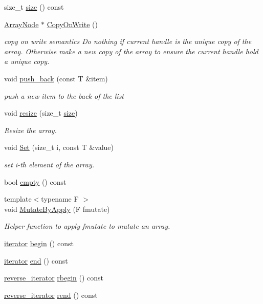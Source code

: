 \begin{DoxyCompactItemize}
size\+\_\+t \hyperlink{classtvm_1_1Array_a6c150ee7d3e46117b099d2052b19aec5}{size} () const 
\item 
\hyperlink{classtvm_1_1ArrayNode}{Array\+Node} $\ast$ \hyperlink{classtvm_1_1Array_a8ebe3653e2bcef7481ab6264f7c231c8}{Copy\+On\+Write} ()
\begin{DoxyCompactList}\small\item\em copy on write semantics Do nothing if current handle is the unique copy of the array. Otherwise make a new copy of the array to ensure the current handle hold a unique copy. \end{DoxyCompactList}\item 
void \hyperlink{classtvm_1_1Array_a24d5ac1f6730d46cb1a6d16729f0a7bb}{push\+\_\+back} (const T \&item)
\begin{DoxyCompactList}\small\item\em push a new item to the back of the list \end{DoxyCompactList}\item 
void \hyperlink{classtvm_1_1Array_a8303345e666f9c72586721bc067e7fc9}{resize} (size\+\_\+t \hyperlink{classtvm_1_1Array_a6c150ee7d3e46117b099d2052b19aec5}{size})
\begin{DoxyCompactList}\small\item\em Resize the array. \end{DoxyCompactList}\item 
void \hyperlink{classtvm_1_1Array_ab3db968deb4be7a51767f22d267eb7af}{Set} (size\+\_\+t i, const T \&value)
\begin{DoxyCompactList}\small\item\em set i-\/th element of the array. \end{DoxyCompactList}\item 
bool \hyperlink{classtvm_1_1Array_a531169863918d8464aa4b905d236674f}{empty} () const 
\item 
{\footnotesize template$<$typename F $>$ }\\void \hyperlink{classtvm_1_1Array_abb864921139827a886c8fec5b7796041}{Mutate\+By\+Apply} (F fmutate)
\begin{DoxyCompactList}\small\item\em Helper function to apply fmutate to mutate an array. \end{DoxyCompactList}\item 
\hyperlink{classtvm_1_1Array_a82550eb5257293ba5af8866aa8ff16e6}{iterator} \hyperlink{classtvm_1_1Array_a5db0d3faad39ca865162e50d555a25fa}{begin} () const 
\item 
\hyperlink{classtvm_1_1Array_a82550eb5257293ba5af8866aa8ff16e6}{iterator} \hyperlink{classtvm_1_1Array_a6f05e6a14eca3ea865da0f293b4a5325}{end} () const 
\item 
\hyperlink{classtvm_1_1Array_a6b71ab5c7c8c2abffe81a0ea3842fd1a}{reverse\+\_\+iterator} \hyperlink{classtvm_1_1Array_ad9e24a3208ffabbc079db08804a6f602}{rbegin} () const 
\item 
\hyperlink{classtvm_1_1Array_a6b71ab5c7c8c2abffe81a0ea3842fd1a}{reverse\+\_\+iterator} \hyperlink{classtvm_1_1Array_adc2c5ea9dacd9a1fae22c409a39007b8}{rend} () const 
\end{DoxyCompactItemize}


